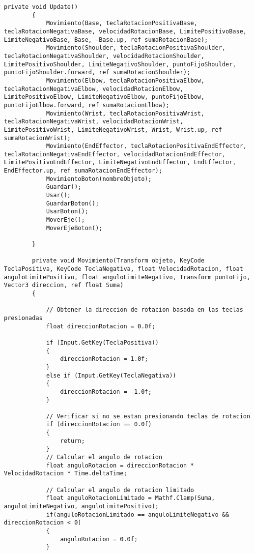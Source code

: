 \begin{lstlisting}[frame=single]
        private void Update()
        {
            Movimiento(Base, teclaRotacionPositivaBase, teclaRotacionNegativaBase, velocidadRotacionBase, LimitePositivoBase, LimiteNegativoBase, Base, -Base.up, ref sumaRotacionBase);
            Movimiento(Shoulder, teclaRotacionPositivaShoulder, teclaRotacionNegativaShoulder, velocidadRotacionShoulder, LimitePositivoShoulder, LimiteNegativoShoulder, puntoFijoShoulder, puntoFijoShoulder.forward, ref sumaRotacionShoulder);
            Movimiento(Elbow, teclaRotacionPositivaElbow, teclaRotacionNegativaElbow, velocidadRotacionElbow, LimitePositivoElbow, LimiteNegativoElbow, puntoFijoElbow, puntoFijoElbow.forward, ref sumaRotacionElbow);
            Movimiento(Wrist, teclaRotacionPositivaWrist, teclaRotacionNegativaWrist, velocidadRotacionWrist, LimitePositivoWrist, LimiteNegativoWrist, Wrist, Wrist.up, ref sumaRotacionWrist);
            Movimiento(EndEffector, teclaRotacionPositivaEndEffector, teclaRotacionNegativaEndEffector, velocidadRotacionEndEffector, LimitePositivoEndEffector, LimiteNegativoEndEffector, EndEffector, EndEffector.up, ref sumaRotacionEndEffector);
            MovimientoBoton(nombreObjeto);
            Guardar();
            Usar();
            GuardarBoton();
            UsarBoton();
            MoverEje();
            MoverEjeBoton();
            
        }
    
        private void Movimiento(Transform objeto, KeyCode TeclaPositiva, KeyCode TeclaNegativa, float VelocidadRotacion, float anguloLimitePositivo, float anguloLimiteNegativo, Transform puntoFijo, Vector3 direccion, ref float Suma)
        {
            
            // Obtener la direccion de rotacion basada en las teclas presionadas
            float direccionRotacion = 0.0f;

            if (Input.GetKey(TeclaPositiva))
            {
                direccionRotacion = 1.0f;
            }
            else if (Input.GetKey(TeclaNegativa))
            {
                direccionRotacion = -1.0f;
            }

            // Verificar si no se estan presionando teclas de rotacion
            if (direccionRotacion == 0.0f)
            {
                return;
            }
            // Calcular el angulo de rotacion
            float anguloRotacion = direccionRotacion * VelocidadRotacion * Time.deltaTime;
            
            // Calcular el angulo de rotacion limitado
            float anguloRotacionLimitado = Mathf.Clamp(Suma, anguloLimiteNegativo, anguloLimitePositivo);
            if(anguloRotacionLimitado == anguloLimiteNegativo && direccionRotacion < 0)
            {
                anguloRotacion = 0.0f;
            }


\end{lstlisting}
